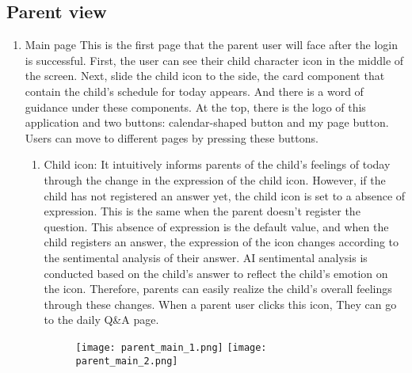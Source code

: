 \documentclass[conference]{IEEEtran}
\begin{document}
    \subsection{Parent view}
    \begin{enumerate}
    \item Main page \hfill \break
            This is the first page that the parent user will face after the login is successful. First, the user can see their child character icon in the middle of the screen. Next, slide the child icon to the side, the card component that contain the child’s schedule for today appears. And there is a word of guidance under these components. At the top, there is the logo of this application and two buttons: calendar-shaped button and my page button. Users can move to different pages by pressing these buttons.
            \begin{enumerate}
                \item Child icon:
                It intuitively informs parents of the child's feelings of today through the change in the expression of the child icon. However, if the child has not registered an answer yet, the child icon is set to a absence of expression. This is the same when the parent doesn’t register the question. This absence of expression is the default value, and when the child registers an answer, the expression of the icon changes according to the sentimental analysis of their answer. AI sentimental analysis is conducted based on the child's answer to reflect the child's emotion on the icon. Therefore, parents can easily realize the child's overall feelings through these changes. When a parent user clicks this icon, They can go to the daily Q\&A page.
                \begin{figure}[H]
                 \centering
                 \texttt{[image: parent\_main\_1.png]}
                 \texttt{[image: parent\_main\_2.png]}
                 \end{figure}
                

\end{enumerate}
\end{enumerate}
\end{document}

